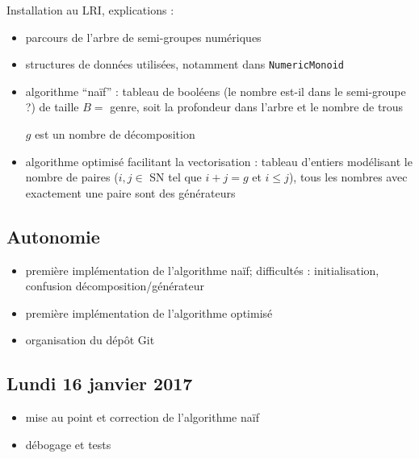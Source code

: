 \documentclass[12pt,a4paper]{article}
\let\leq\leqslant
\begin{document}
Installation au LRI, explications :
\begin{itemize}
	\item	parcours de l'arbre de semi-groupes numériques

	\item	structures de données utilisées, notamment dans \texttt{NumericMonoid}

	\item	algorithme ``naïf'' : tableau de booléens (le nombre est-il dans le semi-groupe ?) de taille $B =$ genre, soit la profondeur dans l'arbre et le nombre de trous
			\begin{algorithmic}
								\STATE $g$ est un nombre de décomposition
							\ENDIF
						\ENDFOR
					\ENDIF
				\ENDFOR
			\end{algorithmic}

	\item	algorithme optimisé facilitant la vectorisation : tableau d'entiers modélisant le nombre de paires ($i, j \in$ SN tel que $i + j = g$ et $i \leq j$), tous les nombres avec exactement une paire sont des générateurs
\end{itemize}

\subsection{Autonomie}

\begin{itemize}
	\item	première implémentation de l'algorithme naïf; difficultés : initialisation, confusion décomposition/générateur
	\item	première implémentation de l'algorithme optimisé
	\item	organisation du dépôt Git
\end{itemize}

\subsection{Lundi 16 janvier 2017}

\begin{itemize}
	\item	mise au point et correction de l'algorithme naïf
	\item	débogage et tests
\end{itemize}
\end{document}

